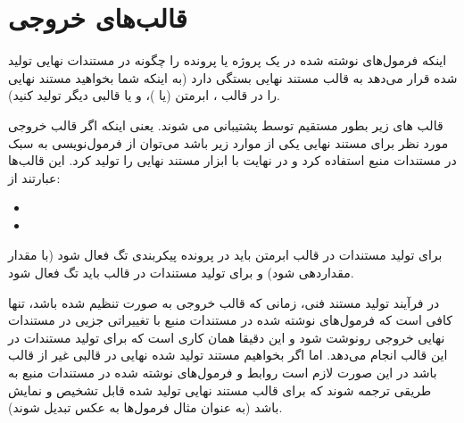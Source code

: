 %
% 
% 
% 
%

\section{قالب‌های خروجی}
اینکه  فرمول‌های نوشته شده در یک پروژه یا پرونده را چگونه در مستندات
نهایی تولید شده قرار می‌دهد به قالب مستند نهایی بستگی دارد (به اینکه شما بخواهید
مستند نهایی را در قالب \lr{\LaTeX}، ابرمتن (یا )،  و یا قالبی
دیگر تولید کنید).

قالب های زیر بطور مستقیم توسط  پشتیبانی می شوند. یعنی اینکه اگر قالب
خروجی مورد نظر برای مستند نهایی یکی از موارد زیر باشد می‌توان از فرمول‌نویسی به
سبک \lr{\LaTeX} در مستندات منبع استفاده کرد و در نهایت با ابزار 
مستند نهایی را تولید کرد. این قالب‌ها عبارتند از:

\begin{itemize}
	\item {}
	\item {}
\end{itemize}

برای تولید مستندات در قالب ابرمتن باید در پرونده پیکربندی تگ 
فعال شود (با مقدار  مقداردهی شود) و برای تولید مستندات در قالب
\lr{\LaTeX} باید تگ  فعال شود.

در فرآیند تولید مستند فنی، زمانی که قالب خروجی به صورت \lr{\LaTeX} تنظیم
شده باشد، تنها کافی است که فرمول‌های نوشته شده در مستندات منبع با تغییراتی
جزیی در مستندات نهایی خروجی رونوشت شود و این دقیقا همان کاری است که
 برای تولید مستندات در این قالب انجام می‌دهد. اما اگر بخواهیم مستند
تولید شده نهایی در قالبی غیر از قالب  \lr{\LaTeX} باشد در این صورت لازم است
روابط و فرمول‌های نوشته شده در مستندات منبع به طریقی ترجمه شوند که برای قالب
مستند نهایی تولید شده قابل تشخیص و نمایش باشد (به عنوان مثال فرمول‌ها به عکس
تبدیل شوند).

